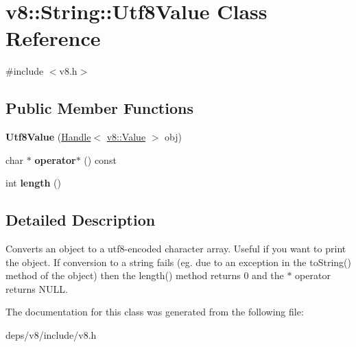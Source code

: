 \hypertarget{classv8_1_1_string_1_1_utf8_value}{}\section{v8\+:\+:String\+:\+:Utf8\+Value Class Reference}
\label{classv8_1_1_string_1_1_utf8_value}


{\ttfamily \#include $<$v8.\+h$>$}

\subsection*{Public Member Functions}
\begin{DoxyCompactItemize}
\item 
\hypertarget{classv8_1_1_string_1_1_utf8_value_aded9fd7ed406e79d5bc40eca15b6b3d7}{}{\bfseries Utf8\+Value} (\hyperlink{classv8_1_1_handle}{Handle}$<$ \hyperlink{classv8_1_1_value}{v8\+::\+Value} $>$ obj)\label{classv8_1_1_string_1_1_utf8_value_aded9fd7ed406e79d5bc40eca15b6b3d7}

\item 
\hypertarget{classv8_1_1_string_1_1_utf8_value_ac2859b31d4f7140ae856d76417a95b0c}{}char $\ast$ {\bfseries operator$\ast$} () const \label{classv8_1_1_string_1_1_utf8_value_ac2859b31d4f7140ae856d76417a95b0c}

\item 
\hypertarget{classv8_1_1_string_1_1_utf8_value_a4efaf8b996607881a6aa19123177f9d4}{}int {\bfseries length} ()\label{classv8_1_1_string_1_1_utf8_value_a4efaf8b996607881a6aa19123177f9d4}

\end{DoxyCompactItemize}


\subsection{Detailed Description}
Converts an object to a utf8-\/encoded character array. Useful if you want to print the object. If conversion to a string fails (eg. due to an exception in the to\+String() method of the object) then the length() method returns 0 and the $\ast$ operator returns N\+U\+L\+L. 

The documentation for this class was generated from the following file\+:\begin{DoxyCompactItemize}
\item 
deps/v8/include/v8.\+h\end{DoxyCompactItemize}
